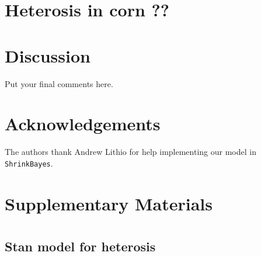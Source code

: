 \documentclass[useAMS,usenatbib,referee]{biom}
\begin{document}
\section{Heterosis in corn ??}
\label{s:corn}

\section{Discussion}
\label{s:discuss}

Put your final comments here. 



\backmatter %



\section*{Acknowledgements}

The authors thank Andrew Lithio for help implementing our model in {\tt ShrinkBayes}.


\section*{Supplementary Materials}





\appendix


\section{}
\subsection{Stan model for heterosis}



\label{lastpage}
\end{document}
